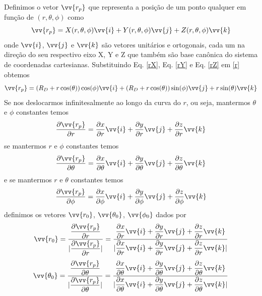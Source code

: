 \documentclass[12pt,oneside,a4paper]{abntex2}
\begin{document}
Definimos o vetor $\vv{r_p}$ que representa a posição de um ponto qualquer em função de $(r,\theta,\phi)$ como
\begin{equation}
\label{r}
\vv{r_p} = X(r,\theta,\phi) \vv{i} + Y(r,\theta,\phi) \vv{j} + Z(r,\theta,\phi) \vv{k}
\end{equation}
onde $\vv{i}$, $\vv{j}$ e $\vv{k}$ são vetores unitários e ortogonais, cada um na direção do seu respectivo eixo X, Y e Z que também são base canônica do sistema de coordenadas cartesianas. Substituindo Eq. \ref{rX}, Eq. \ref{rY} e Eq. \ref{rZ} em \ref{r} obtemos
\begin{equation}
\label{r2}
\vv{r_p} = (R_D+r \cos(\theta)) \cos(\phi) \vv{i} + (R_D+r \cos(\theta)) \sin(\phi) \vv{j} +  r \sin(\theta) \vv{k}
\end{equation}
Se nos deslocarmos infinitesalmente ao longo da curva do $r$, ou seja, mantermos $\theta$ e $\phi$ constantes temos
\begin{equation}
\dfrac{\partial \vv{r_p}}{\partial r} = \dfrac{\partial x}{\partial r}\vv{i} + \dfrac{\partial y}{\partial r}\vv{j} + \dfrac{\partial z}{\partial r}\vv{k}
\end{equation}
se mantermos $r$ e $\phi$ constantes temos
\begin{equation}
\dfrac{\partial \vv{r_p}}{\partial \theta} = \dfrac{\partial x}{\partial \theta}\vv{i} + \dfrac{\partial y}{\partial \theta}\vv{j} + \dfrac{\partial z}{\partial \theta}\vv{k} 
\end{equation}
e se mantermos $r$ e $\theta$ constantes temos
\begin{equation}
\dfrac{\partial \vv{r_p}}{\partial \phi} = \dfrac{\partial x}{\partial \phi}\vv{i} + \dfrac{\partial y}{\partial \phi}\vv{j} + \dfrac{\partial z}{\partial \phi}\vv{k}
\end{equation}
definimos os vetores $\vv{r_0}$, $\vv{\theta_0}$, $\vv{\phi_0}$ dados por
\begin{equation}
\vv{r_0} = \frac{\dfrac{\partial \vv{r_p}}{\partial r}}{ | \dfrac{\partial \vv{r_p}}{\partial r} |} = \frac{\dfrac{\partial x}{\partial r}\vv{i} + \dfrac{\partial y}{\partial r}\vv{j} + \dfrac{\partial z}{\partial r}\vv{k}}{ |\dfrac{\partial x}{\partial r}\vv{i} + \dfrac{\partial y}{\partial r}\vv{j} + \dfrac{\partial z}{\partial r}\vv{k}|} 
\end{equation}
\begin{equation}
\vv{\theta_0} = \frac{\dfrac{\partial \vv{r_p}}{\partial \theta}}{ | \dfrac{\partial \vv{r_p}}{\partial \theta} |} = \frac{ \dfrac{\partial x}{\partial \theta}\vv{i} + \dfrac{\partial y}{\partial \theta}\vv{j} + \dfrac{\partial z}{\partial \theta}\vv{k} }{ |  \dfrac{\partial x}{\partial \theta}\vv{i} + \dfrac{\partial y}{\partial \theta}\vv{j} + \dfrac{\partial z}{\partial \theta}\vv{k}  |}
\end{equation}
\end{document}
